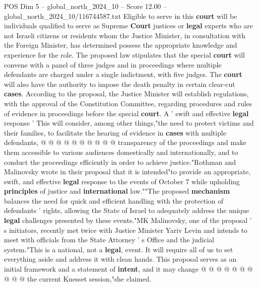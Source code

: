\begin{textsample}{POS Dim 5 – global\_north\_2024\_10 – Score 12.00 – global\_north\_2024\_10/116744587.txt}
Eligible to serve in this \textbf{court} will be individuals qualified to serve as Supreme \textbf{Court} justices or \textbf{legal} experts who are not Israeli citizens or residents whom the Justice Minister, in consultation with the Foreign Minister, has determined possess the appropriate knowledge and experience for the role.
The proposed law stipulates that the special \textbf{court} will convene with a panel of three judges and in proceedings where multiple defendants are charged under a single indictment, with five judges.
The \textbf{court} will also have the authority to impose the death penalty in certain clear-cut \textbf{cases}.
According to the proposal, the Justice Minister will establish regulations, with the approval of the Constitution Committee, regarding procedures and rules of evidence in proceedings before the special \textbf{court}.
A ' swift and effective \textbf{legal} response ' This will consider, among other things,"the need to protect victims and their families, to facilitate the hearing of evidence in \textbf{cases} with multiple defendants, @ @ @ @ @ @ @ @ @ @ transparency of the proceedings and make them accessible to various audiences domestically and internationally, and to conduct the proceedings efficiently in order to achieve justice."Rothman and Malinovsky wrote in their proposal that it is intended"to provide an appropriate, swift, and effective \textbf{legal} response to the events of October 7 while upholding \textbf{principles} of justice and \textbf{international} law.""The proposed \textbf{mechanism} balances the need for quick and efficient handling with the protection of defendants ' rights, allowing the State of Israel to adequately address the unique \textbf{legal} challenges presented by these events."MK Malinovsky, one of the proposal ' s initiators, recently met twice with Justice Minister Yariv Levin and intends to meet with officials from the State Attorney ' s Office and the judicial system."This is a national, not a \textbf{legal}, event.
It will require all of us to set everything aside and address it with clean hands.
This proposal serves as an initial framework and a statement of \textbf{intent}, and it may change @ @ @ @ @ @ @ @ @ @ the current Knesset session,"she claimed.

\end{textsample}
